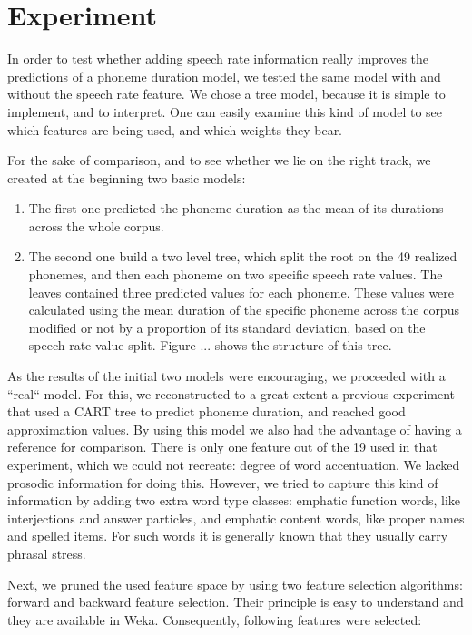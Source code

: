 \documentclass[a4paper]{scrreprt}
\begin{document}
\section{Experiment}
In order to test whether adding speech rate information really improves the predictions of a phoneme duration model, we tested the same model with and without the speech rate feature. We chose a tree model, because it is simple to implement, and to interpret. One can easily examine this kind of model to see which features are being used, and which weights they bear. 

For the sake of comparison, and to see whether we lie on the right track, we created at the beginning two basic models: 

\begin{enumerate}
	\item The first one predicted the phoneme duration as the mean of its durations across the whole corpus. 
	\item The second one build a two level tree, which split the root on the 49 realized phonemes, and then each phoneme on two specific speech rate values. The leaves contained three predicted values for each phoneme. These values were calculated using the mean duration of the specific phoneme across the corpus modified or not by a proportion of its standard deviation, based on the speech rate value split. Figure ... shows the structure of this tree. 
\end{enumerate}

As the results of the initial two models were encouraging, we proceeded with a ``real`` model. For this, we reconstructed to a great extent a previous experiment \cite{Brinckman2003} that used a CART tree to predict phoneme duration, and reached good approximation values. By using this model we also had the advantage of having a reference for comparison. There is only one feature out of the 19 used in that experiment, which we could not recreate: degree of word accentuation. We lacked prosodic information for doing this. However, we tried to capture this kind of information by adding two extra word type classes: emphatic function words, like interjections and answer particles, and emphatic content words, like proper names and spelled items. For such words it is generally known that they usually carry phrasal stress.

Next, we pruned the used feature space by using two feature selection algorithms: forward and backward feature selection. Their principle is easy to understand and they are available in Weka. Consequently, following features were selected:
\end{document}
